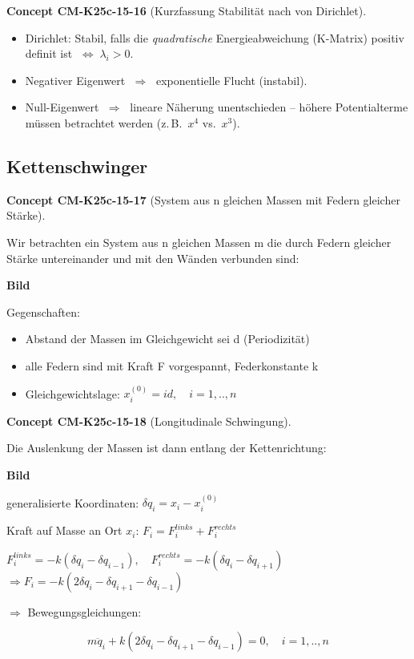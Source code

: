 \documentclass[10pt, letterpaper]{article}
\newcommand{\CustomHeading}[3]{%
  \par\medskip\noindent%
  \textbf{#1 #2} \textnormal{(#3)}.\enskip%
}
\newenvironment{CONC}[2]{\CustomHeading{Concept}{#1}{#2}}{}
\begin{document}
\begin{CONC}{CM-K25c-15-16}{Kurzfassung Stabilität nach von Dirichlet}
\begin{itemize}[leftmargin=*]
\item Dirichlet: Stabil, falls die \emph{quadratische} Energieabweichung
      (K-Matrix) positiv definit ist $\;\Longleftrightarrow\;\lambda_i>0$.
\item Negativer Eigenwert $\;\Longrightarrow\;$ exponentielle Flucht
      (instabil).  
\item Null-Eigenwert $\;\Longrightarrow\;$ lineare Näherung unentschieden –
      höhere Potentialterme müssen betrachtet werden (z.\,B.\ $x^4$ vs.\ $x^3$).
\end{itemize}
\end{CONC}

\subsection{Kettenschwinger}

\begin{CONC}{CM-K25c-15-17}{System aus n gleichen Massen mit Federn gleicher Stärke}
Wir betrachten ein System aus n gleichen Massen m die durch Federn gleicher Stärke untereinander und mit den Wänden verbunden sind:

\textbf{Bild}

Gegenschaften:
\begin{itemize}
\item Abstand der Massen im Gleichgewicht sei d (Periodizität)
\item alle Federn sind mit Kraft F vorgespannt, Federkonstante k
\item Gleichgewichtslage: $x_i^{(0)} = id, \quad i=1,..,n$
\end{itemize}
\end{CONC}

\begin{CONC}{CM-K25c-15-18}{Longitudinale Schwingung}
Die Auslenkung der Massen ist dann entlang der Kettenrichtung:

\textbf{Bild}

generalisierte Koordinaten: $\delta q_i = x_i - x_i^{(0)}$

Kraft auf Masse an Ort $x_i$: $F_i = F_i^{links} + F_i^{rechts}$

$F_i^{links} = -k(\delta q_i - \delta q_{i-1}), \quad F_i^{rechts} = -k(\delta q_i - \delta q_{i+1})$
$\Rightarrow F_i = -k(2\delta q_i - \delta q_{i+1} - \delta q_{i-1})$

$\Rightarrow$ Bewegungsgleichungen:

\begin{equation}
m\ddot{q}_i + k(2\delta q_i - \delta q_{i+1} - \delta q_{i-1}) = 0, \quad i=1,..,n
\end{equation}
\end{CONC}
\end{document}
